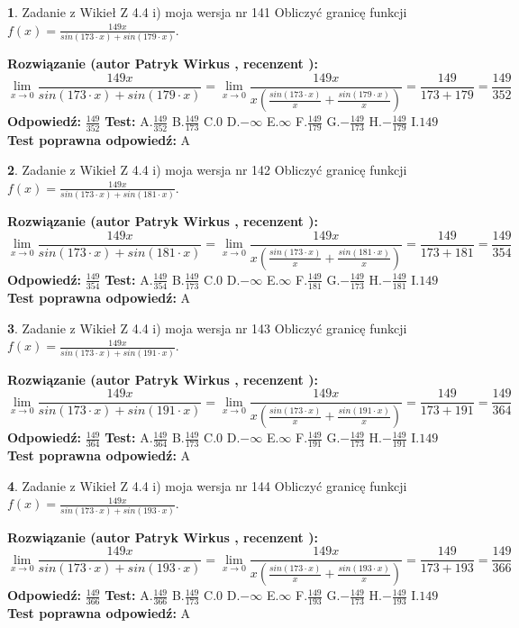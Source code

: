 \documentclass[12pt, a4paper]{article}
\theoremstyle{definition} %
\newtheorem{zad}{}
\newcommand{\zadStart}[1]{\begin{zad}#1\newline}
\newcommand{\zadStop}{\end{zad}}
\newcommand{\rozwStart}[2]{\noindent \textbf{Rozwiązanie (autor #1 , recenzent #2): }\newline}
\newcommand{\rozwStop}{\newline}
\newcommand{\odpStart}{\noindent \textbf{Odpowiedź:}\newline}
\newcommand{\odpStop}{\newline}
\newcommand{\testStart}{\noindent \textbf{Test:}\newline}
\newcommand{\testStop}{\newline}
\newcommand{\kluczStart}{\noindent \textbf{Test poprawna odpowiedź:}\newline}
\newcommand{\kluczStop}{\newline}
\begin{document}
\zadStart{Zadanie z Wikieł Z 4.4 i) moja wersja nr 141}
Obliczyć granicę funkcji $f(x)=\frac{149x}{sin(173\cdot x) +sin(179\cdot x)}$.
\zadStop
\rozwStart{Patryk Wirkus}{}
$$\lim\limits_{x\to 0}\frac{149x}{sin(173\cdot x) +sin(179\cdot x)}=\lim\limits_{x\to 0}\frac{149x}{x(\frac{sin(173\cdot x)}{x}+\frac{sin(179\cdot x)}{x})}=\frac{149}{173+179} = \frac{149}{352}$$
\rozwStop
\odpStart
$\frac{149}{352}$
\odpStop
\testStart
A.$\frac{149}{352}$
B.$\frac{149}{173}$
C.$0$
D.$-\infty$
E.$\infty$
F.$\frac{149}{179}$
G.$-\frac{149}{173}$
H.$-\frac{149}{179}$
I.$149$
\testStop
\kluczStart
A
\kluczStop



\zadStart{Zadanie z Wikieł Z 4.4 i) moja wersja nr 142}
Obliczyć granicę funkcji $f(x)=\frac{149x}{sin(173\cdot x) +sin(181\cdot x)}$.
\zadStop
\rozwStart{Patryk Wirkus}{}
$$\lim\limits_{x\to 0}\frac{149x}{sin(173\cdot x) +sin(181\cdot x)}=\lim\limits_{x\to 0}\frac{149x}{x(\frac{sin(173\cdot x)}{x}+\frac{sin(181\cdot x)}{x})}=\frac{149}{173+181} = \frac{149}{354}$$
\rozwStop
\odpStart
$\frac{149}{354}$
\odpStop
\testStart
A.$\frac{149}{354}$
B.$\frac{149}{173}$
C.$0$
D.$-\infty$
E.$\infty$
F.$\frac{149}{181}$
G.$-\frac{149}{173}$
H.$-\frac{149}{181}$
I.$149$
\testStop
\kluczStart
A
\kluczStop



\zadStart{Zadanie z Wikieł Z 4.4 i) moja wersja nr 143}
Obliczyć granicę funkcji $f(x)=\frac{149x}{sin(173\cdot x) +sin(191\cdot x)}$.
\zadStop
\rozwStart{Patryk Wirkus}{}
$$\lim\limits_{x\to 0}\frac{149x}{sin(173\cdot x) +sin(191\cdot x)}=\lim\limits_{x\to 0}\frac{149x}{x(\frac{sin(173\cdot x)}{x}+\frac{sin(191\cdot x)}{x})}=\frac{149}{173+191} = \frac{149}{364}$$
\rozwStop
\odpStart
$\frac{149}{364}$
\odpStop
\testStart
A.$\frac{149}{364}$
B.$\frac{149}{173}$
C.$0$
D.$-\infty$
E.$\infty$
F.$\frac{149}{191}$
G.$-\frac{149}{173}$
H.$-\frac{149}{191}$
I.$149$
\testStop
\kluczStart
A
\kluczStop



\zadStart{Zadanie z Wikieł Z 4.4 i) moja wersja nr 144}
Obliczyć granicę funkcji $f(x)=\frac{149x}{sin(173\cdot x) +sin(193\cdot x)}$.
\zadStop
\rozwStart{Patryk Wirkus}{}
$$\lim\limits_{x\to 0}\frac{149x}{sin(173\cdot x) +sin(193\cdot x)}=\lim\limits_{x\to 0}\frac{149x}{x(\frac{sin(173\cdot x)}{x}+\frac{sin(193\cdot x)}{x})}=\frac{149}{173+193} = \frac{149}{366}$$
\rozwStop
\odpStart
$\frac{149}{366}$
\odpStop
\testStart
A.$\frac{149}{366}$
B.$\frac{149}{173}$
C.$0$
D.$-\infty$
E.$\infty$
F.$\frac{149}{193}$
G.$-\frac{149}{173}$
H.$-\frac{149}{193}$
I.$149$
\testStop
\kluczStart
A
\kluczStop
\end{document}
